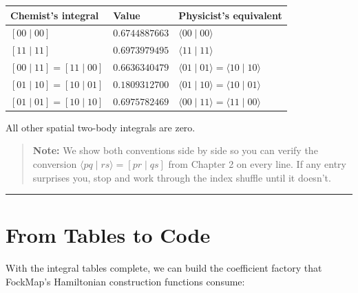 \documentclass[
  11pt,
  oneside]{book}
\begin{document}
\begin{longtable}[]{@{}
  >{\centering\arraybackslash}p{}
  >{\centering\arraybackslash}p{}
  >{\centering\arraybackslash}p{}@{}}
\toprule\noalign{}
\begin{minipage}[b]{\linewidth}\centering
Chemist's integral
\end{minipage} & \begin{minipage}[b]{\linewidth}\centering
Value
\end{minipage} & \begin{minipage}[b]{\linewidth}\centering
Physicist's equivalent
\end{minipage} \\
\midrule\noalign{}
\endhead
\bottomrule\noalign{}
\endlastfoot
\([00 \mid 00]\) & \(0.6744887663\) & \(\langle 00 \mid 00\rangle\) \\
\([11 \mid 11]\) & \(0.6973979495\) & \(\langle 11 \mid 11\rangle\) \\
\([00 \mid 11] = [11 \mid 00]\) & \(0.6636340479\) &
\(\langle 01 \mid 01\rangle = \langle 10 \mid 10\rangle\) \\
\([01 \mid 10] = [10 \mid 01]\) & \(0.1809312700\) &
\(\langle 01 \mid 10\rangle = \langle 10 \mid 01\rangle\) \\
\([01 \mid 01] = [10 \mid 10]\) & \(0.6975782469\) &
\(\langle 00 \mid 11\rangle = \langle 11 \mid 00\rangle\) \\
\end{longtable}

All other spatial two-body integrals are zero.

\begin{quote}
\textbf{Note:} We show both conventions side by side so you can verify
the conversion \(\langle pq \mid rs\rangle = [pr \mid qs]\) from Chapter
2 on every line. If any entry surprises you, stop and work through the
index shuffle until it doesn't.
\end{quote}

\begin{center}\rule{0.5\linewidth}{0.5pt}\end{center}

\section{From Tables to Code}\label{from-tables-to-code}

With the integral tables complete, we can build the coefficient factory
that FockMap's Hamiltonian construction functions consume:
\end{document}

